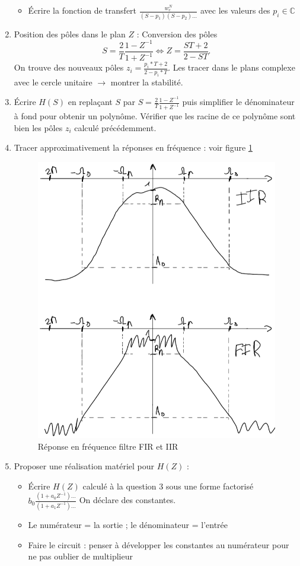 \documentclass{article}
\begin{document}
\begin{enumerate}
\begin{itemize}
            \item Écrire la fonction de transfert $ \frac{w_c^N}{(S-p_1)(S-p_2)\dots} $ avec les valeurs des $ p_i \in \mathbb{C}$ 
        \end{itemize}
    \item Position des pôles dans le plan $ Z $ : Conversion des pôles 
    \[
        S = \frac{2}{T} \frac{1 - Z^{-1}}{1 + Z^{-1}} \Leftrightarrow Z = \frac{ST + 2}{2 - ST}
    .\]
    On trouve des nouveaux pôles $ z_i = \frac{p_i*T + 2}{2 - p_i *T} $. Les tracer dans le plans complexe avec le cercle unitaire $\rightarrow$ montrer la stabilité.
    \item Écrire $ H(S) $ en replaçant $ S $ par $ S = \frac{2}{T} \frac{1 - Z^{-1}}{1 + Z^{-1}} $ puis simplifier le dénominateur à fond pour obtenir un polynôme. Vérifier que les racine de ce polynôme sont bien les pôles $ z_i $ calculé précédemment.
    \item Tracer approximativement la réponses en fréquence : voir figure \ref{rep_freq_iir_fir}
    \begin{figure}[htbp]
        \centering
        \includegraphics*[width=.5\textwidth]{rep_freq_FIR_IIR.png}
        \caption{Réponse en fréquence filtre FIR et IIR}
        \label{rep_freq_iir_fir}
    \end{figure}
    \item Proposer une réalisation matériel pour $ H(Z) $ : 
        \begin{itemize}
            \item Écrire $ H(Z) $ calculé à la question 3 sous une forme factorisé $ b_0 \frac{(1+ a_0 Z^{-1})\dots}{(1 + a_1 Z^{-1})\dots} $ On déclare des constantes. 
            \item Le numérateur = la sortie ; le dénominateur = l'entrée
            \item Faire le circuit : penser à développer les constantes au numérateur pour ne pas oublier de multiplieur
        \end{itemize}
\end{enumerate}
\end{document}
